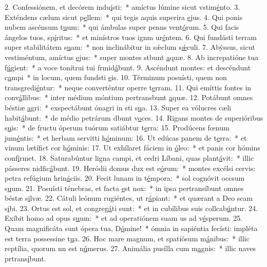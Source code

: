 2. Confessiónem, et decórem indu\uline{í}sti:~* amíctus lúmine sicut vstim\uline{é}nto.
3. Exténdens cælum sicut p\uline{e}llem:~* qui tegis aquis superira \uline{e}jus.
4. Qui ponis nubem ascénsum t\uline{u}um:~* qui ámbulas super penns vent\uline{ó}rum.
5. Qui facis ángelos tuos, sp\uline{í}ritus:~* et minístros tuos ignm ur\uline{é}ntem.
6. Qui fundásti terram super stabilitátem s\uline{u}am:~* non inclinábitur in sǽclum s\uline{ǽ}culi.
7. Abýssus, sicut vestiméntum, amíctus \uline{e}jus:~* super montes stbunt \uline{a}quæ.
8. Ab increpatióne tua f\uline{ú}gient:~* a voce tonítrui tui frmid\uline{á}bunt.
9. Ascéndunt montes: et descéndunt c\uline{a}mpi~* in locum, quem fundsti \uline{e}is.
10. Términum posuísti, quem non transgredi\uline{é}ntur:~* neque converténtur operre t\uline{e}rram.
11. Qui emíttis fontes in conv\uline{á}llibus:~* inter médium móntium pertransbunt \uline{a}quæ.
12. Potábunt omnes béstiæ \uline{a}gri:~* exspectábunt ónagri in sti s\uline{u}a.
13. Super ea vólucres cæli habit\uline{á}bunt:~* de médio petrárum dbunt v\uline{o}ces.
14. Rigans montes de superióribus s\uline{u}is:~* de fructu óperum tuórum satiábtur t\uline{e}rra:
15. Prodúcens fœnum jum\uline{é}ntis:~* et herbam servitti h\uline{ó}minum:
16. Ut edúcas panem de t\uline{e}rra:~* et vinum lætífict cor h\uline{ó}minis:
17. Ut exhílaret fáciem in \uline{ó}leo:~* et panis cor hómins conf\uline{í}rmet.
18. Saturabúntur ligna campi, et cedri Líbani, quas plant\uline{á}vit:~* illic pásseres nidfic\uline{á}bunt.
19. Heródii domus dux est e\uline{ó}rum:~* montes excélsi cervis: petra refúgium hrin\uline{á}ciis.
20. Fecit lunam in t\uline{é}mpora:~* sol cognóvit occsum s\uline{u}um.
21. Posuísti ténebras, et facta \uline{e}st nox:~* in ipsa pertransíbunt omnes béstæ s\uline{i}lvæ.
22. Cátuli leónum rugiéntes, ut r\uline{á}piant:~* et quærant a Deo scam s\uline{i}bi.
23. Ortus est sol, et congreg\uline{á}ti sunt:~* et in cubílibus suis collcab\uline{ú}ntur.
24. Exíbit homo ad opus s\uline{u}um:~* et ad operatiónem suam us ad v\uline{é}sperum.
25. Quam magnificáta sunt ópera tua, D\uline{ó}mine!~* ómnia in sapiéntia fecísti: impléta est terra possessine t\uline{u}a.
26. Hoc mare magnum, et spatiósum m\uline{á}nibus:~* illic reptília, quorum nn est n\uline{ú}merus.
27. Animália pusílla cum m\uline{a}gnis:~* illic naves prtrans\uline{í}bunt.
